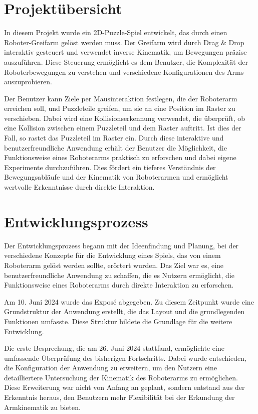\documentclass[12pt]{article}
\begin{document}
    \section{Projektübersicht}
    In diesem Projekt wurde ein 2D-Puzzle-Spiel entwickelt, das durch einen Roboter-Greifarm gelöst werden
    muss. Der Greifarm wird durch Drag & Drop interaktiv gesteuert und verwendet inverse Kinematik, um
    Bewegungen präzise auszuführen. Diese Steuerung ermöglicht es dem Benutzer, die Komplexität der
    Roboterbewegungen zu verstehen und verschiedene Konfigurationen des Arms auszuprobieren.

    Der Benutzer kann Ziele per Mausinteraktion festlegen, die der Roboterarm erreichen soll, und Puzzleteile
    greifen, um sie an eine Position im Raster zu verschieben. Dabei wird eine Kollisionserkennung verwendet,
    die überprüft, ob eine Kollision zwischen einem Puzzleteil und dem Raster auftritt. Ist dies der Fall, so
    rastet das Puzzleteil im Raster ein. Durch diese interaktive und benutzerfreundliche Anwendung erhält der
    Benutzer die Möglichkeit, die Funktionsweise eines Roboterarms praktisch zu erforschen und dabei eigene
    Experimente durchzuführen. Dies fördert ein tieferes Verständnis der Bewegungsabläufe und der Kinematik
    von Roboterarmen und ermöglicht wertvolle Erkenntnisse durch direkte Interaktion.


    \section{Entwicklungsprozess}
    Der Entwicklungsprozess begann mit der Ideenfindung und Planung, bei der verschiedene Konzepte für die
    Entwicklung eines Spiels, das von einem Roboterarm gelöst werden sollte, erörtert wurden. Das Ziel war es,
    eine benutzerfreundliche Anwendung zu schaffen, die es Nutzern ermöglicht, die Funktionsweise eines
    Roboterarms durch direkte Interaktion zu erforschen.

    Am 10. Juni 2024 wurde das Exposé abgegeben. Zu diesem Zeitpunkt wurde eine Grundstruktur der Anwendung
    erstellt, die das Layout und die grundlegenden Funktionen umfasste. Diese Struktur bildete die Grundlage
    für die weitere Entwicklung.

    Die erste Besprechung, die am 26. Juni 2024 stattfand, ermöglichte eine umfassende Überprüfung des
    bisherigen Fortschritts. Dabei wurde entschieden, die Konfiguration der Anwendung zu erweitern, um den
    Nutzern eine detailliertere Untersuchung der Kinematik des Roboterarms zu ermöglichen. Diese Erweiterung
    war nicht von Anfang an geplant, sondern entstand aus der Erkenntnis heraus, den Benutzern mehr
    Flexibilität bei der Erkundung der Armkinematik zu bieten.
\end{document}
